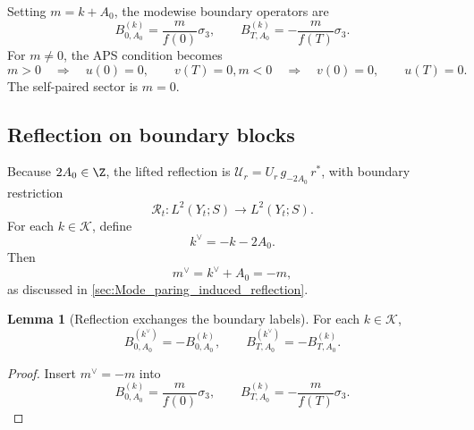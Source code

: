 \documentclass[11pt]{article}
\theoremstyle{definition}
\newtheorem{lemma}[theorem]{Lemma}
\numberwithin{equation}{section}
\begin{document}
Setting \(m=k+A_0\), the modewise boundary operators are
\begin{equation}\label{eq:sec4_fixed_boundary_mode_ops}
B_{0,A_0}^{(k)}=\frac{m}{f(0)}\sigma_3,
\qquad
B_{T,A_0}^{(k)}=-\frac{m}{f(T)}\sigma_3.
\end{equation}
For \(m\neq 0\), the APS condition becomes
\begin{subequations}\label{eq:sec4_fixed_APS_bc}
\begin{equation}\label{eq:sec4_fixed_APS_bc_positive}
m>0
\quad\Longrightarrow\quad
u(0)=0,\qquad v(T)=0,
\end{equation}
\begin{equation}\label{eq:sec4_fixed_APS_bc_negative}
m<0
\quad\Longrightarrow\quad
v(0)=0,\qquad u(T)=0.
\end{equation}
\end{subequations}
The self-paired sector is \(m=0\).


\subsection{Reflection on boundary blocks}

Because \(2A_0\in\Z\), the lifted reflection is
\(\mathcal U_r=U_r\,g_{-2A_0}\,r^*\), with boundary restriction
\begin{equation}\label{eq:sec4_boundary_reflection_operator_fixed}
\mathcal R_t:L^2(Y_t;S)\to L^2(Y_t;S).
\end{equation}
For each \(k\in\mathcal K\), define
\begin{equation}
k^\vee=-k-2A_0.
\end{equation}
Then
\begin{equation}
m^\vee=k^\vee+A_0=-m,
\end{equation}
as discussed in \autoref{sec:Mode_paring_induced_reflection}.

\begin{lemma}[Reflection exchanges the boundary labels]
\label{lem:sec4_fixed_boundary_pairing}
For each \(k\in\mathcal K\),
\begin{equation}
B_{0,A_0}^{(k^\vee)}=-B_{0,A_0}^{(k)},
\qquad
B_{T,A_0}^{(k^\vee)}=-B_{T,A_0}^{(k)}.
\end{equation}
\end{lemma}

\begin{proof}
Insert \(m^\vee=-m\) into
\begin{equation}
B_{0,A_0}^{(k)}=\frac{m}{f(0)}\sigma_3,
\qquad
B_{T,A_0}^{(k)}=-\frac{m}{f(T)}\sigma_3.
\end{equation}
\end{proof}
\end{document}
